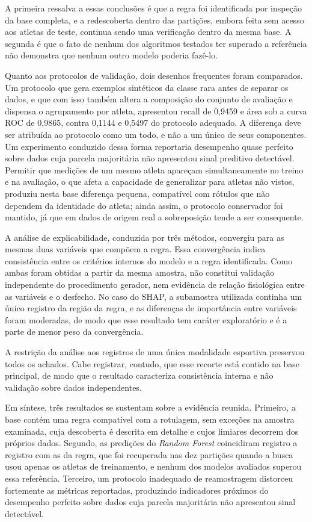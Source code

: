 A primeira ressalva a essas conclusões é que a regra foi identificada por inspeção da base completa, e a redescoberta dentro das partições, embora feita sem acesso aos atletas de teste, continua sendo uma verificação dentro da mesma base. A segunda é que o fato de nenhum dos algoritmos testados ter superado a referência não demonstra que nenhum outro modelo poderia fazê-lo.

Quanto aos protocolos de validação, dois desenhos frequentes foram comparados. Um protocolo que gera exemplos sintéticos da classe rara antes de separar os dados, e que com isso também altera a composição do conjunto de avaliação e dispensa o agrupamento por atleta, apresentou recall de 0{,}9459 e área sob a curva ROC de 0{,}9865, contra 0{,}1144 e 0{,}5497 do protocolo adequado. A diferença deve ser atribuída ao protocolo como um todo, e não a um único de seus componentes. Um experimento conduzido dessa forma reportaria desempenho quase perfeito sobre dados cuja parcela majoritária não apresentou sinal preditivo detectável. Permitir que medições de um mesmo atleta apareçam simultaneamente no treino e na avaliação, o que afeta a capacidade de generalizar para atletas não vistos, produziu nesta base diferença pequena, compatível com rótulos que não dependem da identidade do atleta; ainda assim, o protocolo conservador foi mantido, já que em dados de origem real a sobreposição tende a ser consequente.

A análise de explicabilidade, conduzida por três métodos, convergiu para as mesmas duas variáveis que compõem a regra. Essa convergência indica consistência entre os critérios internos do modelo e a regra identificada. Como ambas foram obtidas a partir da mesma amostra, não constitui validação independente do procedimento gerador, nem evidência de relação fisiológica entre as variáveis e o desfecho. No caso do SHAP, a subamostra utilizada continha um único registro da região da regra, e as diferenças de importância entre variáveis foram moderadas, de modo que esse resultado tem caráter exploratório e é a parte de menor peso da convergência.

A restrição da análise aos registros de uma única modalidade esportiva preservou todos os achados. Cabe registrar, contudo, que esse recorte está contido na base principal, de modo que o resultado caracteriza consistência interna e não validação sobre dados independentes.

Em síntese, três resultados se sustentam sobre a evidência reunida. Primeiro, a base contém uma regra compatível com a rotulagem, sem exceções na amostra examinada, cuja descoberta é descrita em detalhe e cujos limiares decorrem dos próprios dados. Segundo, as predições do \textit{Random Forest} coincidiram registro a registro com as da regra, que foi recuperada nas dez partições quando a busca usou apenas os atletas de treinamento, e nenhum dos modelos avaliados superou essa referência. Terceiro, um protocolo inadequado de reamostragem distorceu fortemente as métricas reportadas, produzindo indicadores próximos do desempenho perfeito sobre dados cuja parcela majoritária não apresentou sinal detectável.

